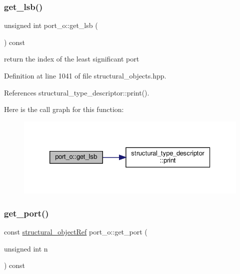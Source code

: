\subsubsection{\texorpdfstring{get\+\_\+lsb()}{get\_lsb()}}
{\footnotesize\ttfamily unsigned int port\+\_\+o\+::get\+\_\+lsb (\begin{DoxyParamCaption}{ }\end{DoxyParamCaption}) const\hspace{0.3cm}{\ttfamily [inline]}}



return the index of the least significant port 



Definition at line 1041 of file structural\+\_\+objects.\+hpp.



References structural\+\_\+type\+\_\+descriptor\+::print().

Here is the call graph for this function\+:
\nopagebreak
\begin{figure}[H]
\begin{center}
\leavevmode
\includegraphics[width=326pt]{df/d75/structport__o_a00a38d69b196805ff8d058885deece37_cgraph}
\end{center}
\end{figure}
\mbox{\label{structport__o_a7dda79b07635ab1129af2b1f10bc5890}} 
\subsubsection{\texorpdfstring{get\+\_\+port()}{get\_port()}}
{\footnotesize\ttfamily const \hyperlink{structural__objects_8hpp_a8ea5f8cc50ab8f4c31e2751074ff60b2}{structural\+\_\+object\+Ref} port\+\_\+o\+::get\+\_\+port (\begin{DoxyParamCaption}\item[{unsigned int}]{n }\end{DoxyParamCaption}) const}



